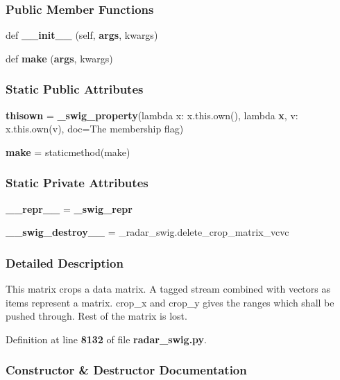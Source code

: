 \subsubsection*{Public Member Functions}
\begin{DoxyCompactItemize}
\item 
def {\bf \+\_\+\+\_\+init\+\_\+\+\_\+} (self, {\bf args}, kwargs)
\item 
def {\bf make} ({\bf args}, kwargs)
\end{DoxyCompactItemize}
\subsubsection*{Static Public Attributes}
\begin{DoxyCompactItemize}
\item 
{\bf thisown} = {\bf \+\_\+swig\+\_\+property}(lambda x\+: x.\+this.\+own(), lambda {\bf x}, v\+: x.\+this.\+own(v), doc=\textquotesingle{}The membership flag\textquotesingle{})
\item 
{\bf make} = staticmethod(make)
\end{DoxyCompactItemize}
\subsubsection*{Static Private Attributes}
\begin{DoxyCompactItemize}
\item 
{\bf \+\_\+\+\_\+repr\+\_\+\+\_\+} = {\bf \+\_\+swig\+\_\+repr}
\item 
{\bf \+\_\+\+\_\+swig\+\_\+destroy\+\_\+\+\_\+} = \+\_\+radar\+\_\+swig.\+delete\+\_\+crop\+\_\+matrix\+\_\+vcvc
\end{DoxyCompactItemize}


\subsubsection{Detailed Description}
\begin{DoxyVerb}This matrix crops a data matrix. A tagged stream combined with vectors as items represent a matrix. crop_x and crop_y gives the ranges which shall be pushed through. Rest of the matrix is lost.\end{DoxyVerb}
 

Definition at line {\bf 8132} of file {\bf radar\+\_\+swig.\+py}.



\subsubsection{Constructor \& Destructor Documentation}
